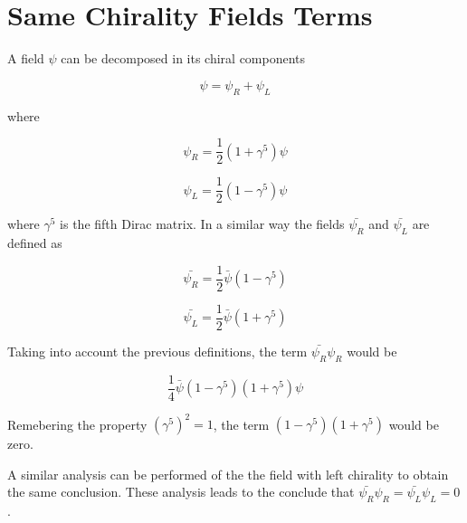 \chapter{Same Chirality Fields Terms} \label{app: samechirality}

A field $\psi$ can be decomposed in its chiral components

$$ \psi = \psi_{R} + \psi_{L} $$

where 

$$ \psi_{R} = \frac{1}{2}\left(1 + \gamma^{5}\right)\psi $$

$$ \psi_{L} = \frac{1}{2}\left(1 - \gamma^{5}\right)\psi $$

where $\gamma^{5}$ is the fifth Dirac matrix. In a similar way the fields $\bar{\psi_{R}}$ and $\bar{\psi_{L}}$ are defined as  

$$ \bar{\psi_{R}} = \frac{1}{2}\bar{\psi}\left(1 - \gamma^{5}\right) $$

$$ \bar{\psi_{L}} = \frac{1}{2}\bar{\psi}\left(1 + \gamma^{5}\right) $$

Taking into account the previous definitions, the term $\bar{\psi_{R}}\psi_{R}$ would be

$$\frac{1}{4}\bar{\psi}\left(1 - \gamma^{5}\right)\left(1+\gamma^{5}\right)\psi$$

Remebering the property $\left(\gamma^{5}\right)^{2} = 1$, the term $\left(1 - \gamma^{5}\right)\left(1+\gamma^{5}\right)$ would be zero.

A similar analysis can be performed of the the field with left chirality to obtain the same conclusion. These analysis leads to the conclude that $\bar{\psi_{R}}\psi_{R} = \bar{\psi_{L}}\psi_{L} = 0$. 




